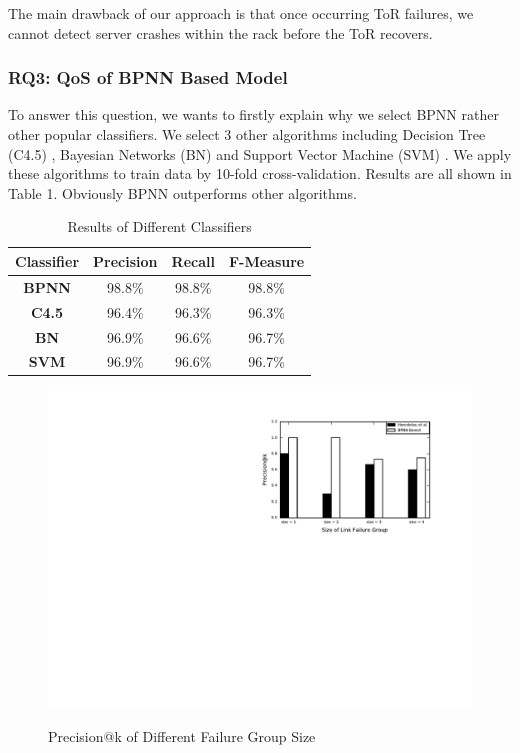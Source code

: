 \documentclass{sig-alternate-05-2015}
\begin{document}
The main drawback of our approach is that once occurring ToR failures, we cannot detect server crashes within the rack before the ToR recovers.


\subsubsection*{RQ3: QoS of BPNN Based Model}
\quad To answer this question, we wants to firstly explain why we select BPNN rather other popular classifiers. We select 3 other algorithms including Decision Tree (C4.5) \cite{quinlan2014c4}, Bayesian Networks (BN) \cite{jensen1996introduction} and Support Vector Machine (SVM) \cite{scholkopf1999advances}. We apply these algorithms to train data by 10-fold cross-validation. Results are all shown in Table 1. Obviously BPNN outperforms other algorithms.

\begin{table}
    \centering
    \caption{Results of Different Classifiers}
    \begin{tabular}{|c|c|c|c|} \hline
        \textbf{Classifier} & \textbf{Precision} & \textbf{Recall} & \textbf{F-Measure} \\ \hline
        \hline
        \textbf{BPNN} & 98.8\% & 98.8\% & 98.8\% \\ \hline
        \textbf{C4.5} & 96.4\% & 96.3\% & 96.3\% \\ \hline
        \textbf{BN} & 96.9\% & 96.6\% & 96.7\% \\ \hline
        \textbf{SVM} & 96.9\% & 96.6\% & 96.7\% \\ \hline
    \end{tabular}
\end{table}

\begin{figure}
  \centering
  \includegraphics[scale=0.7]{precision} \\
  \caption{Precision@k of Different Failure Group Size}
\end{figure}
\end{document}
